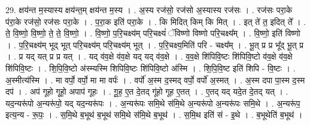 \documentclass[17pt]{extarticle}
\begin{document}
29. क्षय॑न्त म॒स्यास्य क्षय॑न्त॒म् क्षय॑न्त म॒स्य । . अ॒स्य रज॑सो॒ रज॑सो अ॒स्यास्य रज॑सः । . रज॑सः परा॒के प॑रा॒के रज॑सो॒ रज॑सः परा॒के । . प॒रा॒क इति॑ परा॒के । . कि मिदित् किम् कि मित् । . इत् ते॑ त॒ इदित् ते᳚ । . ते॒ वि॒ष्णो॒ वि॒ष्णो॒ ते॒ ते॒ वि॒ष्णो॒ । . वि॒ष्णो॒ प॒रि॒चक्ष्य॑म् परि॒चक्ष्यं॑ ॅविष्णो विष्णो परि॒चक्ष्य᳚म् । . वि॒ष्णो॒ इति॑ विष्णो । . प॒रि॒चक्ष्य॑म् भूद् भूत् परि॒चक्ष्य॑म् परि॒चक्ष्य॑म् भूत् । . प॒रि॒चक्ष्य॒मिति॑ परि - चक्ष्य᳚म् । . भू॒त् प्र प्र भू᳚द् भू॒त् प्र । . प्र यद् यत् प्र प्र यत् । . यद् व॑व॒क्षे व॑व॒क्षे यद् यद् व॑व॒क्षे । . व॒व॒क्षे शि॑पिवि॒ष्टः शि॑पिवि॒ष्टो व॑व॒क्षे व॑व॒क्षे शि॑पिवि॒ष्टः । . शि॒पि॒वि॒ष्टो अ॑स्म्यस्मि शिपिवि॒ष्टः शि॑पिवि॒ष्टो अ॑स्मि । . शि॒पि॒वि॒ष्ट इति॑ शिपि - वि॒ष्टः । . अ॒स्मीत्य॑स्मि । . मा वर्पो॒ वर्पो॒ मा मा वर्पः॑ । . वर्पो॑ अ॒स्म द॒स्मद् वर्पो॒ वर्पो॑ अ॒स्मत् । . अ॒स्म दपा पा॒स्म द॒स्म दप॑ । . अप॑ गूहो गूहो॒ अपाप॑ गूहः । . गू॒ह॒ ए॒त दे॒तद् गू॑हो गूह ए॒तत् । . ए॒तद् यद् यदे॒त दे॒तद् यत् । . यद॒न्यरू॑पो अ॒न्यरू॑पो॒ यद् यद॒न्यरू॑पः । . अ॒न्यरू॑पः समि॒थे स॑मि॒थे अ॒न्यरू॑पो अ॒न्यरू॑पः समि॒थे । . अ॒न्यरू॑प॒ इत्य॒न्य - रू॒पः॒ । . स॒मि॒थे ब॒भूथ॑ ब॒भूथ॑ समि॒थे स॑मि॒थे ब॒भूथ॑ । . स॒मि॒थ इति॑ सं - इ॒थे । . ब॒भूथेति॑ ब॒भूथ॑ । \newline
\end{document}
